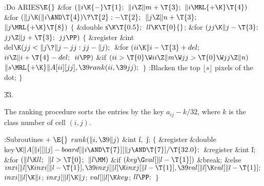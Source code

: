\Y\B\4:Do ARIES\X${}\E{}$\6
\&{for} ${}(\|i\K{-}\T{1};{}$ ${}\|i\Z\|m+\T{3};{}$ ${}\|i\MRL{+{\K}}\T{4}){}$%
\1\6
\&{for} ${}(\|j\K(\|i\AND\T{4})\?\T{2}:{-}\T{2};{}$ ${}\|j\Z\|n+\T{3};{}$ ${}%
\|j\MRL{+{\K}}\T{8}){}$\5
${}\{{}$\5
\1\&{double} \|s${}\K\T{0.5};{}$\7
${}\\{ll}\K\T{0}{}$;\6
\&{for} ${}(\\{jj}\K\|j-\T{3};{}$ ${}\\{jj}\Z\|j+\T{3};{}$ ${}\\{jj}\PP){}$\5
${}\{{}$\5
\1\&{register} \&{int} \\{del}${}\K(\\{jj}<\|j\?\|j-\\{jj}:\\{jj}-\|j);{}$\7
\&{for} ${}(\\{ii}\K\|i-\T{3}+\\{del};{}$ ${}\\{ii}\Z\|i+\T{4}-\\{del};{}$ ${}%
\\{ii}\PP){}$\1\6
\&{if} ${}(\\{ii}>\T{0}\W\\{ii}\Z\|m\W\\{jj}>\T{0}\W\\{jj}\Z\|n){}$\1\5
${}\|s\MRL{+{\K}}\|A[\\{ii}][\\{jj}],\39\\{rank}(\\{ii},\39\\{jj});{}$\2\2\6
\4${}\}{}$\2\6
:Blacken the top $\lfloor s\rfloor$ pixels of the dot\X;\6
\4${}\}{}$\2\2\par
\U33.\fi

The ranking procedure sorts the entries by the key
$a_{ij}-k/32$,
where $k$ is the class number of cell $(i,j)$.

\Y\B\4:Subroutines\X${}\mathrel+\E{}$\6
$\\{rank}(\|i,\39\|j){}$\1\1\6
\&{int} \|i${},{}$ \|j;\2\2\6
${}\{{}$\1\6
\&{register} \&{double} \\{key}${}\K\|A[\|i][\|j]-\\{board}[\|i\AND\T{7}][\|j%
\AND\T{7}]/\T{32.0};{}$\6
\&{register} \&{int} \|l;\7
\&{for} ${}(\|l\K\\{ll};{}$ ${}\|l>\T{0};{}$ ${}\|l\MM){}$\1\6
\&{if} ${}(\\{key}\G\\{val}[\|l-\T{1}]){}$\1\5
\&{break};\2\6
\&{else}\1\5
${}\\{inxi}[\|l]\K\\{inxi}[\|l-\T{1}],\39\\{inxj}[\|l]\K\\{inxj}[\|l-\T{1}],\39%
\\{val}[\|l]\K\\{val}[\|l-\T{1}];{}$\2\2\6
${}\\{inxi}[\|l]\K\|i{}$;\5
${}\\{inxj}[\|l]\K\|j{}$;\5
${}\\{val}[\|l]\K\\{key}{}$;\5
${}\\{ll}\PP;{}$\6
\4${}\}{}$\2\par
\fi

